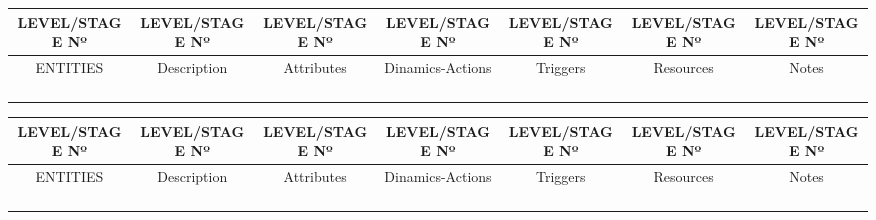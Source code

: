 \documentclass[12pt]{article}
\begin{document}
\begin{longtable}{|c|c|c|c|c|c|c|}
\hline
LEVEL/STAGE  Nº & LEVEL/STAGE  Nº & LEVEL/STAGE  Nº & LEVEL/STAGE  Nº & LEVEL/STAGE  Nº & LEVEL/STAGE  Nº & LEVEL/STAGE  Nº \\ \hline
ENTITIES & Description & Attributes & Dinamics-Actions & Triggers & Resources & Notes \\ \hline
 &  &  &  &  &  &  \\ \hline
 &  &  &  &  &  &  \\ \hline
 &  &  &  &  &  &  \\ \hline
 &  &  &  &  &  &  \\ \hline
\end{longtable}
\begin{longtable}{|c|c|c|c|c|c|c|}
\hline
LEVEL/STAGE  Nº & LEVEL/STAGE  Nº & LEVEL/STAGE  Nº & LEVEL/STAGE  Nº & LEVEL/STAGE  Nº & LEVEL/STAGE  Nº & LEVEL/STAGE  Nº \\ \hline
ENTITIES & Description & Attributes & Dinamics-Actions & Triggers & Resources & Notes \\ \hline
 &  &  &  &  &  &  \\ \hline
 &  &  &  &  &  &  \\ \hline
 &  &  &  &  &  &  \\ \hline
 &  &  &  &  &  &  \\ \hline
\end{longtable}
\end{document}
